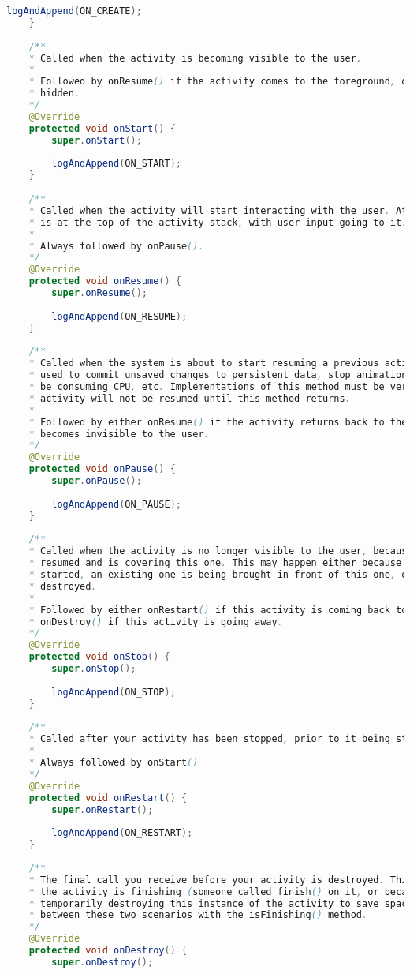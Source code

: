 \documentclass[12pt]{article} %
\begin{document}
\begin{lstlisting}[language=Java]
		logAndAppend(ON_CREATE);
	}
	
	/**
	* Called when the activity is becoming visible to the user.
	*
	* Followed by onResume() if the activity comes to the foreground, or onStop() if it becomes
	* hidden.
	*/
	@Override
	protected void onStart() {
		super.onStart();
		
		logAndAppend(ON_START);
	}
	
	/**
	* Called when the activity will start interacting with the user. At this point your activity
	* is at the top of the activity stack, with user input going to it.
	*
	* Always followed by onPause().
	*/
	@Override
	protected void onResume() {
		super.onResume();
		
		logAndAppend(ON_RESUME);
	}
	
	/**
	* Called when the system is about to start resuming a previous activity. This is typically
	* used to commit unsaved changes to persistent data, stop animations and other things that may
	* be consuming CPU, etc. Implementations of this method must be very quick because the next
	* activity will not be resumed until this method returns.
	*
	* Followed by either onResume() if the activity returns back to the front, or onStop() if it
	* becomes invisible to the user.
	*/
	@Override
	protected void onPause() {
		super.onPause();
		
		logAndAppend(ON_PAUSE);
	}
	
	/**
	* Called when the activity is no longer visible to the user, because another activity has been
	* resumed and is covering this one. This may happen either because a new activity is being
	* started, an existing one is being brought in front of this one, or this one is being
	* destroyed.
	*
	* Followed by either onRestart() if this activity is coming back to interact with the user, or
	* onDestroy() if this activity is going away.
	*/
	@Override
	protected void onStop() {
		super.onStop();
		
		logAndAppend(ON_STOP);
	}
	
	/**
	* Called after your activity has been stopped, prior to it being started again.
	*
	* Always followed by onStart()
	*/
	@Override
	protected void onRestart() {
		super.onRestart();
		
		logAndAppend(ON_RESTART);
	}
	
	/**
	* The final call you receive before your activity is destroyed. This can happen either because
	* the activity is finishing (someone called finish() on it, or because the system is
	* temporarily destroying this instance of the activity to save space. You can distinguish
	* between these two scenarios with the isFinishing() method.
	*/
	@Override
	protected void onDestroy() {
		super.onDestroy();
		

\end{lstlisting}
\end{document}
